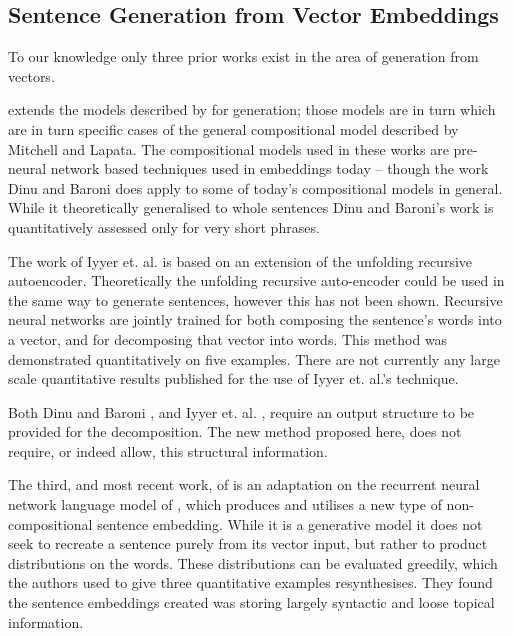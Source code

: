 \documentclass[11pt]{article}
\numberwithin{equation}{section}
\numberwithin{figure}{section}
\theoremstyle{plain}
\theoremstyle{definition}
\begin{document}
\subsection{Sentence Generation from Vector Embeddings}

To our knowledge only three prior works exist in the area of generation from vectors.

\textcite{Dinu2014CompositionalGeneration}  extends the models described by \textcite{zanzotto2010estimating, Guevara2010} for generation; those models are in turn which are in turn specific cases of the general compositional model described by Mitchell and Lapata\textcite{Mitchell2008}. The compositional models used in these works are pre-neural network based techniques used in embeddings today -- though the work Dinu and Baroni does apply to some of today's compositional models in general. While it theoretically generalised to whole sentences Dinu and Baroni's work is quantitatively assessed only for very short phrases.


The work of Iyyer et. al. \textcite{iyyer2014generating} is based on an extension of the unfolding recursive autoencoder\textcite{SocherEtAl2011:PoolRAE}. Theoretically the unfolding recursive auto-encoder could be used in the same way to generate sentences, however this has not been shown. Recursive neural networks are jointly trained for both composing the sentence's words into a vector, and for decomposing that vector into words. This method was demonstrated quantitatively on five examples. There are not currently any large scale quantitative results published for the use of Iyyer et. al.'s technique.

Both Dinu and Baroni \textcite{Dinu2014CompositionalGeneration}, and Iyyer et. al. \textcite{iyyer2014generating}, require an output structure to be provided for the decomposition. The new method proposed here, does not require, or indeed allow, this structural information.

The third, and most recent work, of \textcite{Bowman2015SmoothGeneration} is an adaptation on the recurrent neural network language model of \textcite{mikolov2011RnnLM}, which produces and utilises a new type of non-compositional sentence embedding. While it is a generative model it does not seek to recreate a sentence purely from its vector input, but rather to product distributions on the words. These distributions can be evaluated greedily, which the authors used to give three quantitative examples resynthesises. They found the sentence embeddings created was storing largely syntactic and loose topical information. 
\end{document}
